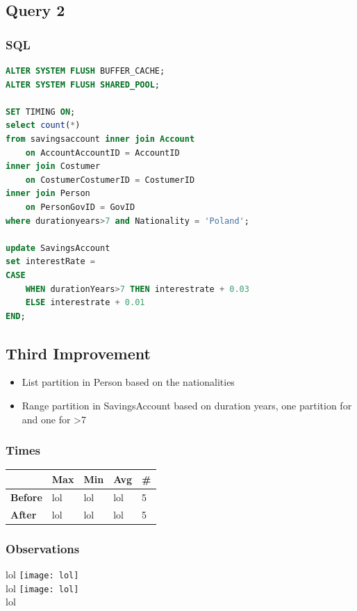 \documentclass[a4paper, 10pt]{article}
\begin{document}
\subsection{Query 2}
\subsubsection{SQL}
\begin{lstlisting}[language=SQL]
ALTER SYSTEM FLUSH BUFFER_CACHE;
ALTER SYSTEM FLUSH SHARED_POOL;

SET TIMING ON;
select count(*)
from savingsaccount inner join Account
    on AccountAccountID = AccountID
inner join Costumer
    on CostumerCostumerID = CostumerID
inner join Person
    on PersonGovID = GovID
where durationyears>7 and Nationality = 'Poland';

update SavingsAccount
set interestRate =
CASE
    WHEN durationYears>7 THEN interestrate + 0.03
    ELSE interestrate + 0.01
END;
\end{lstlisting}

\subsection{Third Improvement}
\begin{itemize}
  \item List partition in Person based on the nationalities
  \item Range partition in SavingsAccount based on duration years, one partition for  and one for >7
\end{itemize}
\subsubsection{Times}
\begin{table}[H]
\begin{tabular}{l|l|l|l|l|}
\cline{2-5}
\textbf{}                             & \textbf{Max} & \textbf{Min} & \textbf{Avg} & \textbf{\#}  \\ \hline
\multicolumn{1}{|l|}{\textbf{Before}} & lol         & lol         & lol          & 5            \\ \hline
\multicolumn{1}{|l|}{\textbf{After}}  & lol         & lol         & lol          & 5            \\ \hline
\end{tabular}
\end{table}
\subsubsection{Observations}
lol
\texttt{[image: lol]}\\ 
lol
\texttt{[image: lol]}\\
lol
\end{document}
